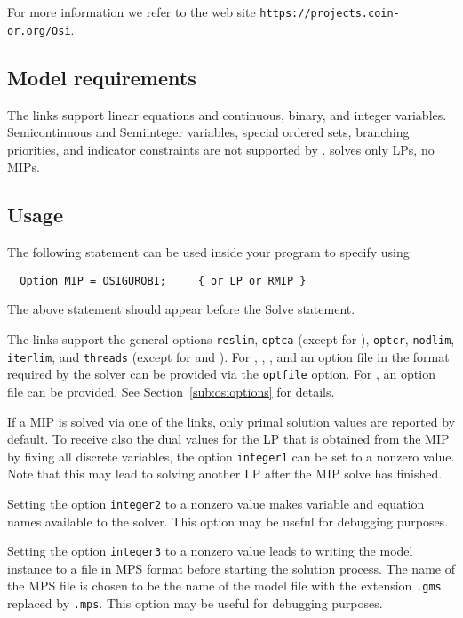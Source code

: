 For more information we refer to the \OSI web site \texttt{https://projects.coin-or.org/Osi}.

\subsection{Model requirements}

The \OSI links support linear equations and continuous, binary, and integer variables.
Semicontinuous and Semiinteger variables, special ordered sets, branching priorities, and indicator constraints are not supported by \OSI.
\OSISOPLEX solves only LPs, no MIPs.

\subsection{Usage}

The following statement can be used inside your \GAMS program to specify using \OSIGUROBI
\begin{verbatim}
  Option MIP = OSIGUROBI;     { or LP or RMIP }
\end{verbatim}

The above statement should appear before the Solve statement.

The links support the general \GAMS options \texttt{reslim}, \texttt{optca} (except for \OSIGLPK), \texttt{optcr}, \texttt{nodlim}, \texttt{iterlim}, and \texttt{threads} (except for \OSIGLPK and \OSISOPLEX).
For \OSICPLEX, \OSIGUROBI, \OSIMOSEK, and \OSIXPRESS an option file in the format required by the solver can be provided via the \GAMS \texttt{optfile} option.
For \OSIGLPK, an \GAMS option file can be provided.
See Section~\ref{sub:osioptions} for details.

If a MIP is solved via one of the \OSI links, only primal solution values are reported by default.
To receive also the dual values for the LP that is obtained from the MIP by fixing all discrete variables, the \GAMS option \texttt{integer1} can be set to a nonzero value. Note that this may lead to solving another LP after the MIP solve has finished.

Setting the \GAMS option \texttt{integer2} to a nonzero value makes variable and equation names available to the solver.
This option may be useful for debugging purposes.

Setting the \GAMS option \texttt{integer3} to a nonzero value leads to writing the model instance to a file in MPS format before starting the solution process.
The name of the MPS file is chosen to be the name of the \GAMS model file with the extension \texttt{.gms} replaced by \texttt{.mps}.
This option may be useful for debugging purposes.

